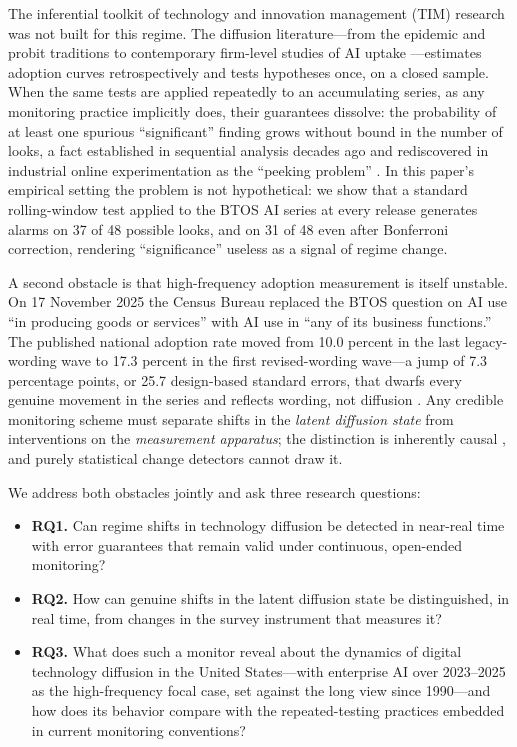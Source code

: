 \documentclass[review,authoryear,12pt]{elsarticle}
\begin{document}
The inferential toolkit of technology and innovation management (TIM) research was not built for this regime. The diffusion literature---from the epidemic and probit traditions \citep{bass1969,geroski2000,rogers2003} to contemporary firm-level studies of AI uptake \citep{mcelheran2024,zolas2020}---estimates adoption curves retrospectively and tests hypotheses once, on a closed sample. When the same tests are applied repeatedly to an accumulating series, as any monitoring practice implicitly does, their guarantees dissolve: the probability of at least one spurious ``significant'' finding grows without bound in the number of looks, a fact established in sequential analysis decades ago \citep{wald1945,armitage1969} and rediscovered in industrial online experimentation as the ``peeking problem'' \citep{johari2022}. In this paper's empirical setting the problem is not hypothetical: we show that a standard rolling-window test applied to the BTOS AI series at every release generates alarms on 37 of 48 possible looks, and on 31 of 48 even after Bonferroni correction, rendering ``significance'' useless as a signal of regime change.

A second obstacle is that high-frequency adoption measurement is itself unstable. On 17 November 2025 the Census Bureau replaced the BTOS question on AI use ``in producing goods or services'' with AI use in ``any of its business functions.'' The published national adoption rate moved from 10.0 percent in the last legacy-wording wave to 17.3 percent in the first revised-wording wave---a jump of 7.3 percentage points, or 25.7 design-based standard errors, that dwarfs every genuine movement in the series and reflects wording, not diffusion \citep{bick2026}. Any credible monitoring scheme must separate shifts in the \emph{latent diffusion state} from interventions on the \emph{measurement apparatus}; the distinction is inherently causal \citep{pearl2009}, and purely statistical change detectors cannot draw it.

We address both obstacles jointly and ask three research questions:
\begin{itemize}
\item \textbf{RQ1.} Can regime shifts in technology diffusion be detected in near-real time with error guarantees that remain valid under continuous, open-ended monitoring?
\item \textbf{RQ2.} How can genuine shifts in the latent diffusion state be distinguished, in real time, from changes in the survey instrument that measures it?
\item \textbf{RQ3.} What does such a monitor reveal about the dynamics of digital technology diffusion in the United States---with enterprise AI over 2023--2025 as the high-frequency focal case, set against the long view since 1990---and how does its behavior compare with the repeated-testing practices embedded in current monitoring conventions?
\end{itemize}
\end{document}
